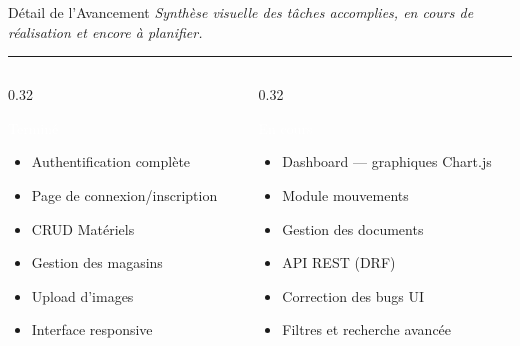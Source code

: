 \documentclass[
  aspectratio=169,       %
  xcolor=dvipsnames,     %
  t                      %
]{beamer}
\newcommand{\framedesc}[1]{%
  {\small\itshape\textcolor{PrimaryDark!80}{#1}}\par%
  \vspace{1pt}%
  {\color{PrimaryMid}\rule{\textwidth}{0.4pt}}%
  \vspace{4pt}%
}
\begin{document}
\begin{frame}{Détail de l'Avancement}
  \framedesc{Synthèse visuelle des tâches accomplies, en cours de réalisation et encore à planifier.}

  \begin{columns}[T]

    \begin{column}{0.32\textwidth}
      \begin{block}{\textcolor{white}{Terminé}}
        \begin{itemize}
          \item[\textcolor{PrimaryMid}{\checkmark}] Authentification complète
          \item[\textcolor{PrimaryMid}{\checkmark}] Page de connexion/inscription
          \item[\textcolor{PrimaryMid}{\checkmark}] CRUD Matériels
          \item[\textcolor{PrimaryMid}{\checkmark}] Gestion des magasins
          \item[\textcolor{PrimaryMid}{\checkmark}] Upload d'images
          \item[\textcolor{PrimaryMid}{\checkmark}] Interface responsive
        \end{itemize}
      \end{block}
    \end{column}

    \begin{column}{0.32\textwidth}
      \begin{alertblock}{\textcolor{white}{En cours}}
        \begin{itemize}
          \item[$\rightarrow$] Dashboard — graphiques Chart.js
          \item[$\rightarrow$] Module mouvements
          \item[$\rightarrow$] Gestion des documents
          \item[$\rightarrow$] API REST (DRF)
          \item[$\rightarrow$] Correction des bugs UI
          \item[$\rightarrow$] Filtres et recherche avancée
        \end{itemize}
      \end{alertblock}
    \end{column}


\end{columns}
\end{frame}
\end{document}
